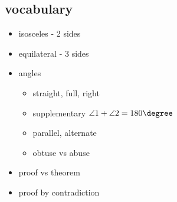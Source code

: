 \subsection{vocabulary}

\begin{itemize}
    \item isosceles - 2 sides
    \item equilateral - 3 sides
    \item angles
        \begin{itemize}
            \item straight, full, right
            \item supplementary \( \angle 1 + \angle 2 = 180 \degree \)
            \item parallel, alternate
            \item obtuse vs abuse
        \end{itemize}
    \item proof vs theorem
    \item proof by contradiction
\end{itemize}
